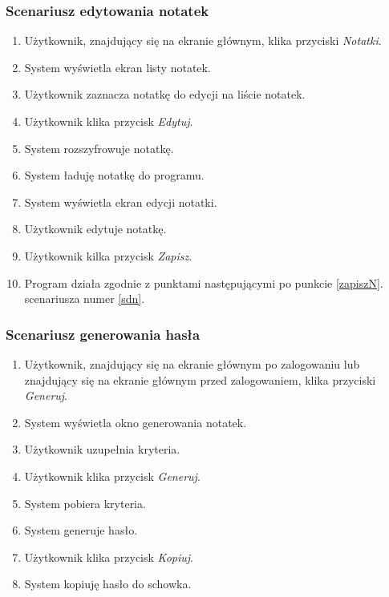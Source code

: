 \documentclass[a4paper]{article}
\begin{document}
\subsubsection{Scenariusz edytowania notatek}
\begin{enumerate}
    \item Użytkownik, znajdujący się na ekranie głównym, klika przyciski \textit{Notatki}.
    \item System wyświetla ekran listy notatek.
    \item Użytkownik zaznacza notatkę do edycji na liście notatek.
    \item Użytkownik klika przycisk \textit{Edytuj}.
    \item System rozszyfrowuje notatkę.
    \item System ładuję notatkę do programu.
    \item System wyświetla ekran edycji notatki.
    \item Użytkownik edytuje notatkę.
    \item Użytkownik kilka przycisk \textit{Zapisz}.
    \item Program działa zgodnie z punktami następującymi po punkcie \ref{zapiszN}. scenariusza numer \ref{sdn}.
\end{enumerate}

\subsubsection{Scenariusz generowania hasła}
\begin{enumerate}
    \item Użytkownik, znajdujący się na ekranie głównym po zalogowaniu lub znajdujący się na ekranie głównym przed zalogowaniem, klika przyciski \textit{Generuj}.
    \item System wyświetla okno generowania notatek.
    \item Użytkownik uzupełnia kryteria.
    \item Użytkownik klika przycisk \textit{Generuj}.
    \item System pobiera kryteria.
    \item System generuje hasło.
    \item Użytkownik klika przycisk \textit{Kopiuj}.
    \item System kopiuję hasło do schowka.
\end{enumerate}
\end{document}
